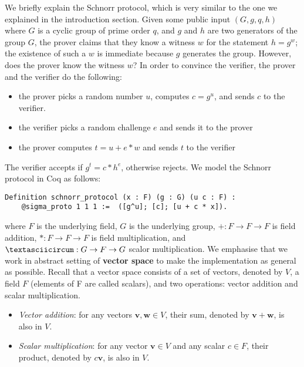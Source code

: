 \documentclass[sigconf]{acmart}
\begin{document}
  We briefly explain the Schnorr protocol, which is very similar to 
  the one we explained in the introduction section.
  Given some public input $(G, g, q, h)$ where $G$
  is a cyclic group of prime order $q$, and $g$ and $h$ are two 
  generators of the group $G$, the prover claims that they know a
  witness $w$ for the statement $h = g^w$; the existence of such
  a $w$ is immediate because $g$ generates the group. However,
  does the prover know the witness $w$? In order to convince the
  verifier, the prover and the verifier do the following:
  \begin{itemize}
    \item the prover picks a random number $u$, computes $c = g^u$,
    and sends $c$ to the verifier.
    \item the verifier picks a random challenge $e$ and sends it to
    the prover
    \item the prover computes $t = u + e * w$ and sends $t$ to the
    verifier
  \end{itemize}

The verifier accepts if $g^t = c * h^e$, otherwise rejects. 
We model the Schnorr protocol in Coq as follows: 
 
\begin{lstlisting}[language=Coq]
  Definition schnorr_protocol (x : F) (g : G) (u c : F) : 
    @sigma_proto 1 1 1 :=  ([g^u]; [c]; [u + c * x]).
\end{lstlisting}
  
 where $F$ is the underlying field, $G$ is the underlying group,
 $+ : F \rightarrow F \rightarrow F$ is field addition,
 $* : F \rightarrow F \rightarrow F$ is field multiplication, and
 $\textasciicircum : G \rightarrow F \rightarrow G$ scalor multiplication. 
 We emphasise that we work in abstract setting of \textbf{vector space} to 
 make the implementation as general as possible. Recall that a vector space consists of a set of 
 vectors, denoted by \(V\), a field \(F\) (elements of F are called scalars), and 
 two operations: vector addition and scalar multiplication.

\begin{itemize}
    \item \textit{Vector addition}: for any vectors \(\mathbf{v}, \mathbf{w} \in V\), their sum, denoted by \(\mathbf{v} + \mathbf{w}\), is also in \(V\).
    \item \textit{Scalar multiplication}: for any vector \(\mathbf{v} \in V\) and any scalar \(c \in F\), their product, denoted by \(c\mathbf{v}\), is also in \(V\).
\end{itemize}
\end{document}
